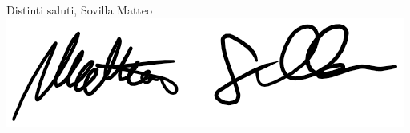 \documentclass[a4paper,12pt]{article}
\begin{document}
\begin{titlepage}
		\vspace{1cm}
		Distinti saluti,
		\flushright Sovilla Matteo\\
		\vspace{0.4cm}
		\includegraphics[scale=0.5]{../../../Immagini/Firme/MatteoSovilla.png}
		
	\end{titlepage}
\end{document}
